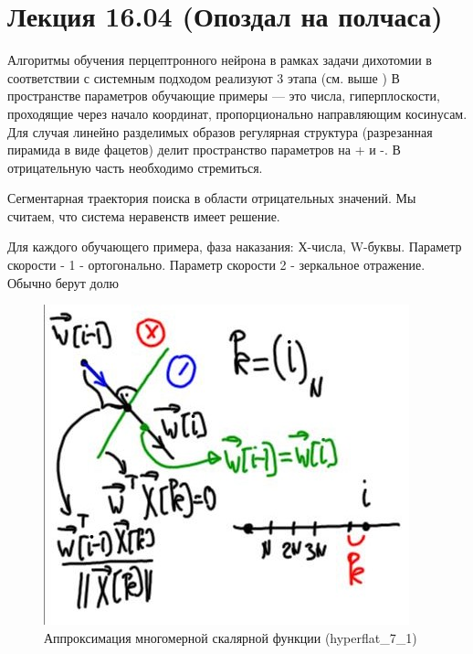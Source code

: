 \documentclass{article}
\numberwithin{equation}{subsection}
\begin{document}
\section{Лекция 16.04 (Опоздал на полчаса)}

Алгоритмы обучения перцептронного нейрона в рамках задачи дихотомии
в соответствии с системным подходом реализуют 3 этапа (см. выше )
В пространстве параметров обучающие примеры --- это числа, гиперплоскости,
проходящие через начало координат, пропорционально направляющим косинусам.
Для случая линейно разделимых образов регулярная структура (разрезанная пирамида 
в виде фацетов) делит пространство параметров на + и -. 
В отрицательную часть необходимо стремиться.


Сегментарная траектория поиска в области отрицательных значений. Мы
считаем, что система неравенств имеет решение.


Для каждого обучающего примера, фаза наказания:
Х-числа, W-буквы. Параметр скорости - 1 - ортогонально. Параметр скорости 2 -
зеркальное отражение. Обычно берут долю



\begin{figure}[H]
    \centering
    \includegraphics[height=8 cm]{hyperflat_7_1.jpeg}
    \caption{Аппроксимация многомерной скалярной функции (hyperflat\_7\_1)}
    \label{hyperflat_7_1}
\end{figure}
\end{document}
